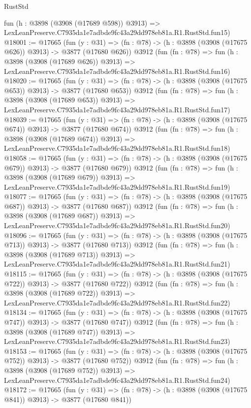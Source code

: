\begin{lexlean}{RustStd}
\begin{coremodule}
    fun (h : @3898 (@3908 (@17689 @598)) @3913) =>
    LexLeanPreserve.C7935da1e7adbde9fc43a29dd978eb81a.R1.RustStd.fun15)
@18001 := @17665
    (fun (y : @31) => (fn : @78) -> (h : @3898 (@3908 (@17675 @626)) @3913) -> @3877 (@17680 @626))
    @3912
    (fun (fn : @78) =>
    fun (h : @3898 (@3908 (@17689 @626)) @3913) =>
    LexLeanPreserve.C7935da1e7adbde9fc43a29dd978eb81a.R1.RustStd.fun16)
@18020 := @17665
    (fun (y : @31) => (fn : @78) -> (h : @3898 (@3908 (@17675 @653)) @3913) -> @3877 (@17680 @653))
    @3912
    (fun (fn : @78) =>
    fun (h : @3898 (@3908 (@17689 @653)) @3913) =>
    LexLeanPreserve.C7935da1e7adbde9fc43a29dd978eb81a.R1.RustStd.fun17)
@18039 := @17665
    (fun (y : @31) => (fn : @78) -> (h : @3898 (@3908 (@17675 @674)) @3913) -> @3877 (@17680 @674))
    @3912
    (fun (fn : @78) =>
    fun (h : @3898 (@3908 (@17689 @674)) @3913) =>
    LexLeanPreserve.C7935da1e7adbde9fc43a29dd978eb81a.R1.RustStd.fun18)
@18058 := @17665
    (fun (y : @31) => (fn : @78) -> (h : @3898 (@3908 (@17675 @679)) @3913) -> @3877 (@17680 @679))
    @3912
    (fun (fn : @78) =>
    fun (h : @3898 (@3908 (@17689 @679)) @3913) =>
    LexLeanPreserve.C7935da1e7adbde9fc43a29dd978eb81a.R1.RustStd.fun19)
@18077 := @17665
    (fun (y : @31) => (fn : @78) -> (h : @3898 (@3908 (@17675 @687)) @3913) -> @3877 (@17680 @687))
    @3912
    (fun (fn : @78) =>
    fun (h : @3898 (@3908 (@17689 @687)) @3913) =>
    LexLeanPreserve.C7935da1e7adbde9fc43a29dd978eb81a.R1.RustStd.fun20)
@18096 := @17665
    (fun (y : @31) => (fn : @78) -> (h : @3898 (@3908 (@17675 @713)) @3913) -> @3877 (@17680 @713))
    @3912
    (fun (fn : @78) =>
    fun (h : @3898 (@3908 (@17689 @713)) @3913) =>
    LexLeanPreserve.C7935da1e7adbde9fc43a29dd978eb81a.R1.RustStd.fun21)
@18115 := @17665
    (fun (y : @31) => (fn : @78) -> (h : @3898 (@3908 (@17675 @722)) @3913) -> @3877 (@17680 @722))
    @3912
    (fun (fn : @78) =>
    fun (h : @3898 (@3908 (@17689 @722)) @3913) =>
    LexLeanPreserve.C7935da1e7adbde9fc43a29dd978eb81a.R1.RustStd.fun22)
@18134 := @17665
    (fun (y : @31) => (fn : @78) -> (h : @3898 (@3908 (@17675 @747)) @3913) -> @3877 (@17680 @747))
    @3912
    (fun (fn : @78) =>
    fun (h : @3898 (@3908 (@17689 @747)) @3913) =>
    LexLeanPreserve.C7935da1e7adbde9fc43a29dd978eb81a.R1.RustStd.fun23)
@18153 := @17665
    (fun (y : @31) => (fn : @78) -> (h : @3898 (@3908 (@17675 @752)) @3913) -> @3877 (@17680 @752))
    @3912
    (fun (fn : @78) =>
    fun (h : @3898 (@3908 (@17689 @752)) @3913) =>
    LexLeanPreserve.C7935da1e7adbde9fc43a29dd978eb81a.R1.RustStd.fun24)
@18172 := @17665
    (fun (y : @31) => (fn : @78) -> (h : @3898 (@3908 (@17675 @841)) @3913) -> @3877 (@17680 @841))

\end{coremodule}
\end{lexlean}
